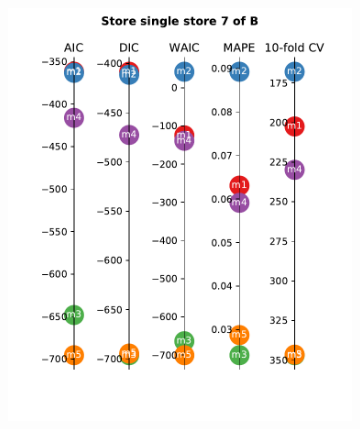 \documentclass[english, 12pt, a4paper, sci, utf8, a-1b, online]{aaltothesis}
\begin{document}
\begin{figure}
\begin{subfigure}[htb]{0.33\textwidth}
	\end{subfigure}
	
	\begin{subfigure}[htb]{0.33\textwidth}
		\centering
		\includegraphics[width=\textwidth]{../plots/metrics/metrics_plot_single_store_7_of_B.pdf}
	\end{subfigure}
	\begin{subfigure}[htb]{0.33\textwidth}
		\centering

\end{subfigure}
\end{figure}
\end{document}
